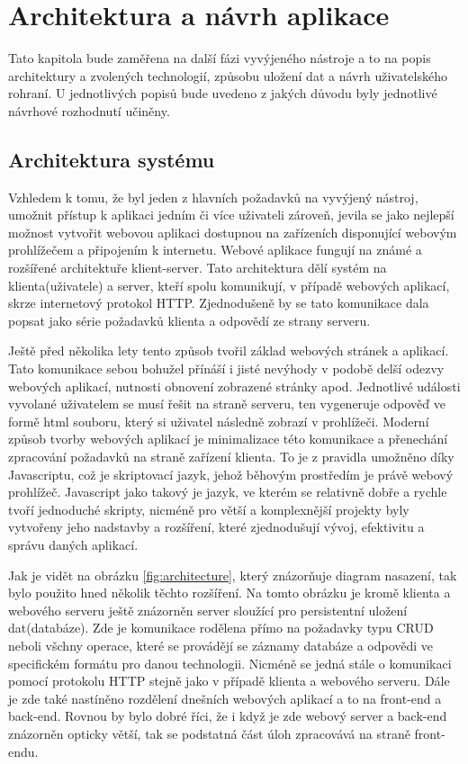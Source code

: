 \chapter{Architektura a návrh aplikace}
\label{sec:navrh}
Tato kapitola bude zaměřena na další fázi vyvýjeného nástroje a to na popis architektury a zvolených technologií, způsobu uložení dat a návrh uživatelského rohraní. U jednotlivých popisů bude uvedeno z jakých důvodu byly jednotlivé návrhové rozhodnutí učiněny. 

\section{Architektura systému}
Vzhledem k tomu, že byl jeden z hlavních požadavků na vyvýjený nástroj, umožnit přístup k aplikaci jedním či více uživateli zároveň, jevila se jako nejlepší možnost vytvořit webovou aplikaci dostupnou na zařízeních disponující webovým prohlížečem a připojením k internetu. Webové aplikace fungují na známé a rozšířené architektuře klient-server. Tato architektura dělí systém na klienta(uživatele) a server, kteří spolu komunikují, v případě webových aplikací, skrze internetový protokol HTTP. Zjednodušeně by se tato komunikace dala popsat jako série požadavků klienta a odpovědí ze strany serveru. 

Ještě před několika lety tento způsob tvořil základ webových stránek a aplikací. Tato komunikace sebou bohužel přínáší i jisté nevýhody v podobě delší odezvy webových aplikací, nutnosti obnovení zobrazené stránky apod. Jednotlivé události vyvolané uživatelem se musí řešit na straně serveru, ten vygeneruje odpověď ve formě html souboru, který si uživatel následně zobrazí v prohlížeči. Moderní způsob tvorby webových aplikací je minimalizace této komunikace a přenechání zpracování požadavků na straně zařízení klienta. To je z pravidla umožněno díky Javascriptu, což je skriptovací jazyk, jehož běhovým prostředím je právě webový prohlížeč. Javascript jako takový je jazyk, ve kterém se relativně dobře a rychle tvoří jednoduché skripty, nicméně pro větší a komplexnější projekty byly vytvořeny jeho nadstavby a rozšíření, které zjednodušují vývoj, efektivitu a správu daných aplikací. 

Jak je vidět na obrázku \ref{fig:architecture}, který znázorňuje diagram nasazení, tak bylo použito hned několik těchto rozšíření. Na tomto obrázku je kromě klienta a webového serveru ještě znázorněn server sloužící pro persistentní uložení dat(databáze). Zde je komunikace rodělena přímo na požadavky typu CRUD neboli všchny operace, které se provádějí se záznamy databáze a odpovědi ve specifickém formátu pro danou technologii. Nicméně se jedná stále o komunikaci pomocí protokolu HTTP stejně jako v případě klienta a webového serveru. Dále je zde také nastíněno rozdělení dnešních webových aplikací a to na front-end a back-end. Rovnou by bylo dobré říci, že i když je zde webový server a back-end znázorněn opticky větší, tak se podstatná část úloh zpracovává na straně front-endu. 

